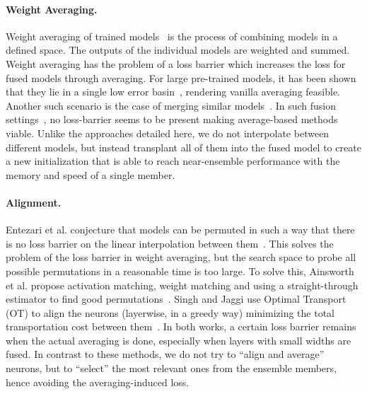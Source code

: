 \paragraph{Weight Averaging.}
Weight averaging of trained models~\cite{DBLP:journals/corr/abs-2002-06440} is the process of combining models in a defined space. The outputs of the individual models are weighted and summed. Weight averaging has the problem of a loss barrier which increases the loss for fused models through averaging. For large pre-trained models, it has been shown that they lie in a single low error basin~\cite{DBLP:journals/corr/abs-2008-11687, wortsman2022model}, rendering vanilla averaging feasible. Another such scenario is the case of merging similar models~\cite{li2023deep}. In such fusion settings~\cite{inproceedings, Leontev_2019}, no loss-barrier seems to be present making average-based methods viable.
Unlike the approaches detailed here, we do not interpolate between different models, but instead transplant all of them into the fused model to create a new initialization that is able to reach near-ensemble performance with the memory and speed of a single member.

\paragraph{Alignment.} %
Entezari et al. conjecture that models can be permuted in such a way that there is no loss barrier on the linear interpolation between them~\cite{entezari2022role}. This solves the problem of the loss barrier in weight averaging, but the search space to probe all possible permutations in a reasonable time is too large. To solve this, Ainsworth et al. propose activation matching, weight matching and using a straight-through estimator to find good permutations~\cite{ainsworth2023git}. Singh and Jaggi use Optimal Transport (OT) to align the neurons (layerwise, in a greedy way) minimizing the total transportation cost between them~\cite{singh2023model}. In both works, a certain loss barrier remains when the actual averaging is done, especially when layers with small widths are fused. In contrast to these methods, we do not try to ``align and average'' neurons, but to ``select'' the most relevant ones from the ensemble members, hence avoiding the averaging-induced loss.

